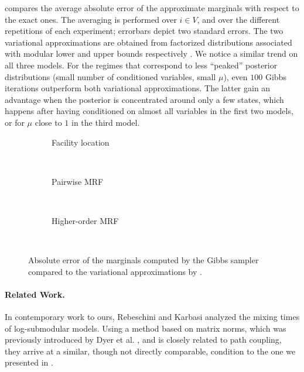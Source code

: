  compares the average absolute error of the approximate marginals with respect to the exact ones.
The averaging is performed over $i \in V$, and over the different repetitions of each experiment; errorbars depict two standard errors.
The two variational approximations are obtained from factorized distributions associated with modular lower and upper bounds respectively \cite{djolonga14}.
We notice a similar trend on all three models.
For the regimes that correspond to less ``peaked'' posterior distributions (small number of conditioned variables, small $\mu$), even $100$ Gibbs iterations outperform both variational approximations.
The latter gain an advantage when the posterior is concentrated around only a few states, which happens after having conditioned on almost all variables in the first two models, or for $\mu$ close to $1$ in the third model.

\setlength{}
\setlength{}
\newcommand{\subflen}{\textwidth}
\begin{figure}[tb]
  \begin{subfigure}[b]{\subflen}
    \hspace{6em}
    \vspace{-1.5em}
    \caption{Facility location}
    \label{fig:gibbs_exp1}
  \end{subfigure}\\[0.5em]
  \begin{subfigure}[b]{\subflen}
    \hspace{6.35em}
    \vspace{-1.5em}
    \caption{Pairwise MRF}
    \label{fig:gibbs_exp2}
  \end{subfigure}\\[0.5em]
  \begin{subfigure}[b]{\subflen}
    \hspace{6em}
    \vspace{-1.5em}
    \caption{Higher-order MRF}
    \label{fig:gibbs_exp3}
  \end{subfigure}\\
  \caption{Absolute error of the marginals computed by the Gibbs sampler compared to the variational approximations by \cite{djolonga14}.}
  \label{fig:exp}
\end{figure}


\paragraph{Related Work.}
In contemporary work to ours, Rebeschini and Karbasi \cite{rebeschini15} analyzed the mixing times of log-submodular models.
Using a method based on matrix norms, which was previously introduced by Dyer et al. \cite{dyer09}, and is closely related to path coupling, they arrive at a similar, though not directly comparable, condition to the one we presented in .

